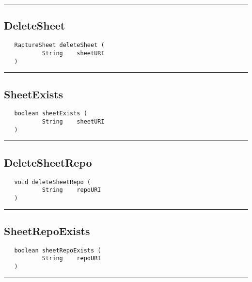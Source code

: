 \rule{15cm}{2pt}
\subsection{DeleteSheet}
\label{Api:DeleteSheet}
\begin{verbatim}
   RaptureSheet deleteSheet (
           String    sheetURI
   )
\end{verbatim}



\rule{15cm}{2pt}
\subsection{SheetExists}
\label{Api:SheetExists}
\begin{verbatim}
   boolean sheetExists (
           String    sheetURI
   )
\end{verbatim}



\rule{15cm}{2pt}
\subsection{DeleteSheetRepo}
\label{Api:DeleteSheetRepo}
\begin{verbatim}
   void deleteSheetRepo (
           String    repoURI
   )
\end{verbatim}



\rule{15cm}{2pt}
\subsection{SheetRepoExists}
\label{Api:SheetRepoExists}
\begin{verbatim}
   boolean sheetRepoExists (
           String    repoURI
   )
\end{verbatim}



\rule{15cm}{2pt}
